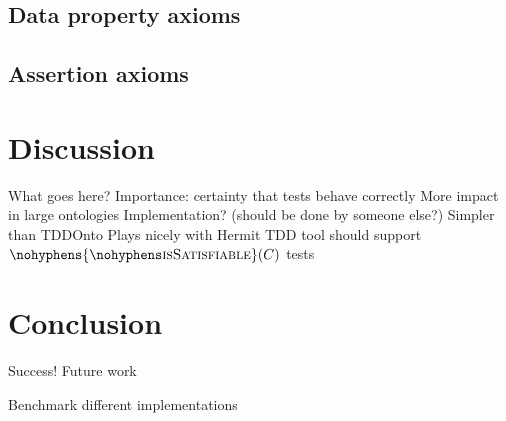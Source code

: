 \documentclass[draft]{sig-alternate}
\let\oldtextproc\textproc
\renewcommand{\textproc}[1]{\nohyphens{\oldtextproc{#1}}}
\begin{document}
\subsection{Data property axioms}
\subsection{Assertion axioms}

\section{Discussion}
\label{sec:discussion}

\begin{todos}
  \todo What goes here?
  \todo Importance: certainty that tests behave correctly
  \todo More impact in large ontologies
  \todo Implementation? (should be done by someone else?)
  \todo Simpler than TDDOnto
  \todo Plays nicely with Hermit
  \todo TDD tool should support $\textproc{isSatisfiable}(C)$ tests
\end{todos}

\section{Conclusion}
\label{sec:conclusion}

\begin{todos}
  \todo Success!
  \todo Future work
  \begin{todos}
    \todo Benchmark different implementations
  \end{todos}
\end{todos}



\end{document}
